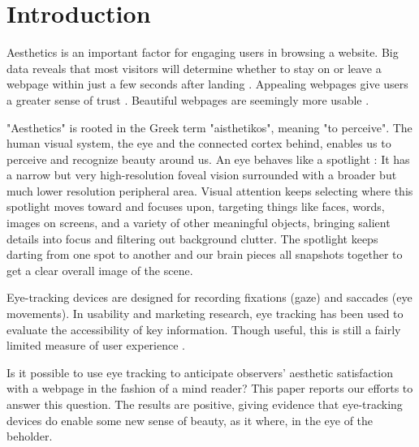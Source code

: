 \section{Introduction}
\label{sec:intro}
Aesthetics is an important factor for engaging users in browsing a website.
Big data reveals that most visitors will determine whether to stay on or leave a webpage within just a few seconds after landing \citep{Liu2010}.
Appealing webpages give users a greater sense of trust
\citep{Casal2008The, Li2010Increasing, Lindgaard2011}.
Beautiful webpages are seemingly more usable \citep{Tractinsky2000}.

"Aesthetics" is rooted in the Greek term "aisthetikos", meaning "to perceive".
The human visual system, the eye and the connected cortex behind, enables us to perceive and recognize beauty around us.
An eye behaves like a spotlight \citep{Eriksen1972}: It has a narrow but very high-resolution foveal vision surrounded with a broader but much lower resolution peripheral area.
Visual attention keeps selecting where this spotlight moves toward and focuses upon, targeting things like faces, words, images on screens, and a variety of other meaningful objects, bringing salient details into focus and filtering out background clutter.
The spotlight keeps darting from one spot to another and our brain pieces all snapshots together to get a clear overall image of the scene.

Eye-tracking devices are designed for recording fixations (gaze) and saccades (eye movements).
In usability and marketing research, eye tracking has been used to evaluate the accessibility of key information.
Though useful, this is still a fairly limited measure of user experience \citep{Santella}.

Is it possible to use eye tracking to anticipate observers' aesthetic satisfaction with a webpage in the fashion of a mind reader?
This paper reports our efforts to answer this question.
The results are positive, giving evidence that eye-tracking devices do enable some new sense of beauty, as it where, in the eye of the beholder.

